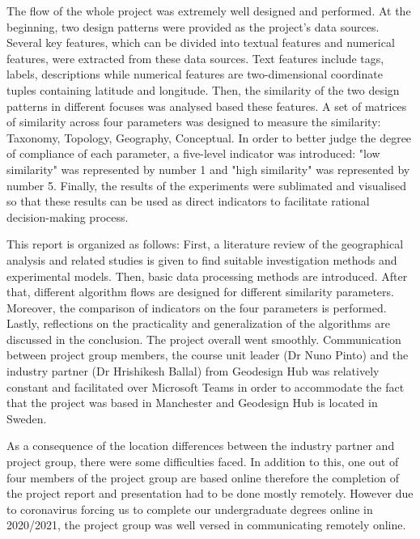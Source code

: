 \marginLeft{}
The flow of the whole project was extremely well designed and performed. At the beginning, two design patterns were provided as the project's data sources. Several key features, which can be divided into textual features and numerical features, were extracted from these data sources. Text features include tags, labels, descriptions while numerical features are two-dimensional coordinate tuples containing latitude and longitude. Then, the similarity of the two design patterns in different focuses was analysed based these features. A set of matrices of similarity across four parameters was designed to measure the similarity: Taxonomy, Topology, Geography, Conceptual. In order to better judge the degree of compliance of each parameter, a five-level indicator was introduced: 
"low similarity" was represented by number 1 and "high similarity" was represented by number 5.  Finally, the results of the experiments were sublimated and visualised so that these results can be used as direct indicators to facilitate rational decision-making process.

\marginLeft{}
This report is organized as follows: First, a literature review of the geographical analysis and related studies is given to find suitable investigation methods and experimental models. Then, basic data processing methods are introduced. After that, different algorithm flows are designed for different similarity parameters. Moreover, the comparison of indicators on the four parameters is performed. Lastly, reflections on the practicality and generalization of the algorithms are discussed in the conclusion.  The project overall went smoothly. Communication between project group members, the course unit leader (Dr Nuno Pinto)  and the industry partner (Dr Hrishikesh Ballal) from Geodesign Hub was relatively constant and facilitated over Microsoft Teams in order to accommodate the fact that the project was based in Manchester and Geodesign Hub is located in Sweden. 

As a consequence of the location differences between the industry partner and project group, there were some difficulties faced.  In addition to this, one out of four members of the project group are based online therefore the completion of the project report and presentation had to be done mostly remotely. However due to coronavirus forcing us to complete our undergraduate degrees online in 2020/2021, the project group was well versed in communicating remotely online.


